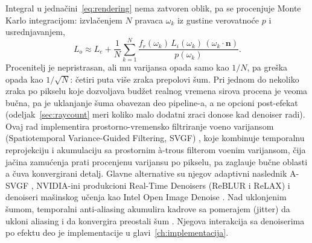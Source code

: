Integral u jedna\v{c}ini~\eqref{eq:rendering} nema zatvoren oblik, pa se procenjuje Monte Karlo
integracijom: izvla\v{c}enjem $N$ pravaca $\omega_k$ iz gustine verovatno\'ce $p$ i usrednjavanjem,
\begin{equation}
L_o \approx L_e + \frac{1}{N}\sum_{k=1}^{N}
\frac{f_r(\omega_k)\, L_i(\omega_k)\, (\omega_k \cdot \mathbf{n})}{p(\omega_k)}.
\label{eq:mc}
\end{equation}
Procenitelj je nepristrasan, ali mu varijansa opada samo kao $1/N$, pa gre\v{s}ka opada kao $1/\sqrt{N}$:
\v{c}etiri puta vi\v{s}e zraka prepolovi \v{s}um. Pri jednom do nekoliko zraka po pikselu koje dozvoljava bud\v{z}et
realnog vremena sirova procena je veoma bu\v{c}na, pa je uklanjanje \v{s}uma obavezan deo pipeline-a, a ne
opcioni post-efekat (odeljak~\ref{sec:raycount} meri koliko malo dodatni zraci donose kad denoiser radi). Ovaj
rad implementira prostorno-vremensko filtriranje vo\dj eno varijansom (Spatiotemporal Variance-Guided
Filtering, SVGF) \cite{schied2017svgf}, koje kombinuje temporalnu reprojekciju i akumulaciju sa
prostornim \`a-trous filterom vo\dj enim varijansom, \v{c}ija ja\v{c}ina zamu\'cenja prati procenjenu varijansu
po pikselu, pa zagla\dj uje bu\v{c}ne oblasti a \v{c}uva konvergirani detalj. Glavne alternative su njegov adaptivni
naslednik A-SVGF \cite{schied2018asvgf}, NVIDIA-ini produkcioni Real-Time Denoisers (ReBLUR i ReLAX)
\cite{nvidia_nrd} i denoiseri ma\v{s}inskog u\v{c}enja kao Intel Open Image Denoise \cite{intel_oidn}. Nad
uklonjenim \v{s}umom, temporalni anti-aliasing akumulira kadrove sa pomerajem (jitter) da ukloni
aliasing i da konvergira preostali \v{s}um \cite{karis2014taa}. Njegova interakcija sa denoiserima po efektu
deo je implementacije u glavi~\ref{ch:implementacija}.
